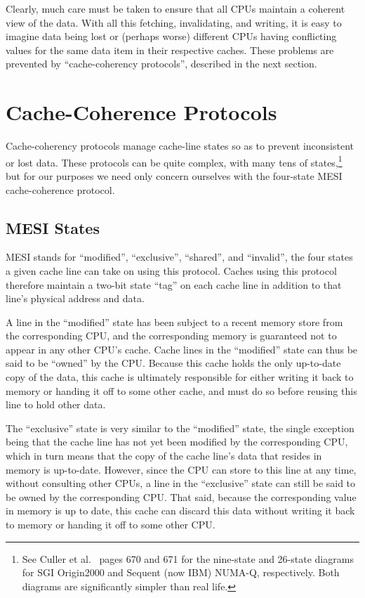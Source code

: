 Clearly, much care must be taken to ensure that all CPUs maintain
a coherent view of the data.
With all this fetching, invalidating, and writing, it is easy to
imagine data being lost or (perhaps worse) different CPUs having
conflicting values for the same data item in their respective
caches.
These problems are prevented by ``cache-coherency protocols'',
described in the next section.

\section{Cache-Coherence Protocols}
\label{sec:app:whymb:Cache-Coherence Protocols}

Cache-coherency protocols manage cache-line states so as to prevent
inconsistent or lost data.
These protocols can be quite complex, with many tens
of states,\footnote{
	See Culler et al.~\cite{DavidECuller1999} pages 670 and 671
	for the nine-state and 26-state diagrams for SGI Origin2000
	and Sequent (now IBM) NUMA-Q, respectively.
	Both diagrams are significantly simpler than real life.}
but for our purposes we need only concern ourselves with the
four-state MESI cache-coherence protocol.

\subsection{MESI States}
\label{sec:app:whymb:MESI States}

MESI stands for ``modified'', ``exclusive'', ``shared'', and ``invalid'',
the four states a given cache line can take on using this
protocol.
Caches using this protocol therefore maintain a two-bit state ``tag'' on each
cache line in addition to that line's physical address and data.

A line in the ``modified'' state has been subject to a recent memory store
from the corresponding CPU, and the corresponding memory is guaranteed
not to appear in any other CPU's cache.
Cache lines in the ``modified'' state can thus be said to be ``owned''
by the CPU.
Because this cache holds the only up-to-date copy of the data, this
cache is ultimately responsible for either writing it back to memory
or handing it off to some other cache, and must do so before reusing
this line to hold other data.

The ``exclusive'' state is very similar to the ``modified'' state,
the single exception being that the cache line has not yet been
modified by the corresponding CPU, which in turn means that the
copy of the cache line's data that resides in memory is up-to-date.
However, since the CPU can store to this line at any time, without
consulting other CPUs, a line in the ``exclusive'' state can still
be said to be owned by the corresponding CPU.
That said, because the corresponding value in memory is up to date,
this cache can discard this data without writing it back to memory
or handing it off to some other CPU.

